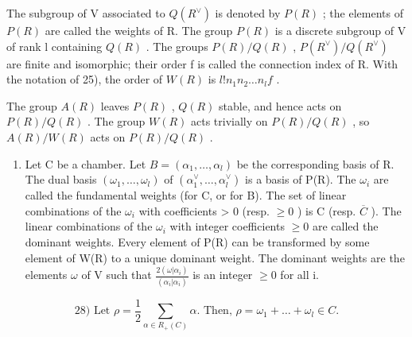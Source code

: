 The subgroup of V associated to \(Q(R^{\vee})\) is denoted by \(P(R)\) ; the elements of \(P(R)\) are called the weights of R. The group \(P(R)\) is a discrete subgroup of V of rank l containing \(Q(R)\) . The groups \(P(R)/Q(R)\) , \(P(R^{\vee})/Q(R^{\vee})\) are finite and isomorphic; their order f is called the connection index of R. With the notation of 25), the order of \(W(R)\) is \(l!n_{1}n_{2}\ldots n_{l}f\) .

The group \(A(R)\) leaves \(P(R)\) , \(Q(R)\) stable, and hence acts on \(P(R)/Q(R)\) . The group \(W(R)\) acts trivially on \(P(R)/Q(R)\) , so \(A(R)/W(R)\) acts on \(P(R)/Q(R)\) .

\begin{enumerate}
\def\labelenumi{\arabic{enumi})}
\setcounter{enumi}{26}
\tightlist
\item
  Let C be a chamber. Let \(B = (\alpha_{1}, \ldots, \alpha_{l})\) be the corresponding basis of R. The dual basis \((\omega_{1}, \ldots, \omega_{l})\) of \((\alpha_{1}^{\vee}, \ldots, \alpha_{l}^{\vee})\) is a basis of P(R). The \(\omega_{i}\) are called the fundamental weights (for C, or for B). The set of linear combinations of the \(\omega_{i}\) with coefficients \textgreater{} 0 (resp. \(\geqslant 0\) ) is C (resp. \(\overline{C}\) ). The linear combinations of the \(\omega_{i}\) with integer coefficients \(\geqslant 0\) are called the dominant weights. Every element of P(R) can be transformed by some element of W(R) to a unique dominant weight. The dominant weights are the elements \(\omega\) of V such that \(\frac{2(\omega|\alpha_{i})}{(\alpha_{i}|\alpha_{i})}\) is an integer \(\geqslant 0\) for all i.
\end{enumerate}

\[
28) \text {   Let   } \rho = \frac {1}{2} \sum_ {\alpha \in R _ {+} (C)} \alpha . \text {   Then,   } \rho = \omega_ {1} + \dots + \omega_ {l} \in C.
\]


